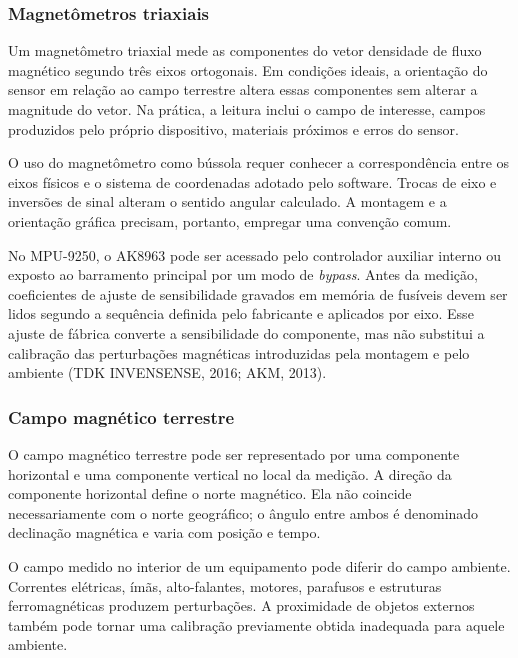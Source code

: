 \documentclass[a4paper,12pt]{article}
\begin{document}
\subsubsection{Magnet\^ometros triaxiais}


Um magnet\^ometro triaxial mede as componentes do vetor densidade de fluxo magn\'etico segundo tr\^es eixos ortogonais. Em condi\c{c}\~oes ideais, a orienta\c{c}\~ao do sensor em rela\c{c}\~ao ao campo terrestre altera essas componentes sem alterar a magnitude do vetor. Na pr\'atica, a leitura inclui o campo de interesse, campos produzidos pelo pr\'oprio dispositivo, materiais pr\'oximos e erros do sensor.


O uso do magnet\^ometro como b\'ussola requer conhecer a correspond\^encia entre os eixos f\'isicos e o sistema de coordenadas adotado pelo software. Trocas de eixo e invers\~oes de sinal alteram o sentido angular calculado. A montagem e a orienta\c{c}\~ao gr\'afica precisam, portanto, empregar uma conven\c{c}\~ao comum.


No MPU-9250, o AK8963 pode ser acessado pelo controlador auxiliar interno ou exposto ao barramento principal por um modo de \emph{bypass}. Antes da medi\c{c}\~ao, coeficientes de ajuste de sensibilidade gravados em mem\'oria de fus\'iveis devem ser lidos segundo a sequ\^encia definida pelo fabricante e aplicados por eixo. Esse ajuste de f\'abrica converte a sensibilidade do componente, mas n\~ao substitui a calibra\c{c}\~ao das perturba\c{c}\~oes magn\'eticas introduzidas pela montagem e pelo ambiente (TDK INVENSENSE, 2016; AKM, 2013).


\subsubsection{Campo magn\'etico terrestre}


O campo magn\'etico terrestre pode ser representado por uma componente horizontal e uma componente vertical no local da medi\c{c}\~ao. A dire\c{c}\~ao da componente horizontal define o norte magn\'etico. Ela n\~ao coincide necessariamente com o norte geogr\'afico; o \^angulo entre ambos \'e denominado declina\c{c}\~ao magn\'etica e varia com posi\c{c}\~ao e tempo.


O campo medido no interior de um equipamento pode diferir do campo ambiente. Correntes el\'etricas, \'im\~as, alto-falantes, motores, parafusos e estruturas ferromagn\'eticas produzem perturba\c{c}\~oes. A proximidade de objetos externos tamb\'em pode tornar uma calibra\c{c}\~ao previamente obtida inadequada para aquele ambiente.
\end{document}
